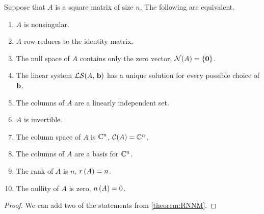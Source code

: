\documentclass{ximera}
\begin{document}
\begin{theorem}

  Suppose that $A$ is a square matrix of size $n$.  The following are equivalent.
  \begin{enumerate}\item $A$ is nonsingular.
  \item $A$ row-reduces to the identity matrix.
  \item The null space of $A$ contains only the zero vector, $\mathcal{N}\!\left(A\right)=\left\{\mathbf{0}\right\}$.
  \item The linear system $\mathcal{LS}\!\left(A,\,\mathbf{b}\right)$ has a unique solution for every possible choice of $\mathbf{b}$.
  \item The columns of $A$ are a linearly independent set.
  \item $A$ is invertible.
  \item The column space of $A$ is $\mathbb{C}^{n}$, $\mathcal{C}\!\left(A\right)=\mathbb{C}^{n}$.
  \item The columns of $A$ are a basis for $\mathbb{C}^{n}$.
  \item The rank of $A$ is $n$, $r\left(A\right)=n$.
  \item The nullity of $A$ is zero, $n\left(A\right)=0$.
  \end{enumerate}

  \begin{proof}
    We can add two of the statements from \ref{theorem:RNNM}.
  \end{proof}
\end{theorem}
\end{document}
